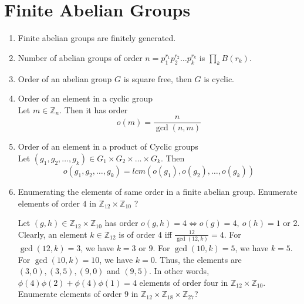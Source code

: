 \section{Finite Abelian Groups}
\begin{enumerate}
	\item Finite abelian groups are finitely generated.
	\item Number of abelian groups of order $n = p_1^{r_1}p_2^{r_2}\dots p_k^{r_k}$ is $\prod_k B(r_k)$.
	\item Order of an abelian group $G$ is square free, then $G$ is cyclic.
	\item Order of an element in a cyclic group\\
	Let $m \in \mathbb{Z}_n$.
	Then it has order $$o(m) = \frac{n}{\gcd(n,m)}$$
	\item Order of an element in a product of Cyclic groups\\
	Let $(g_1,g_2,\dots,g_k) \in G_1 \times G_2 \times \dots \times G_k$. Then 
	$$o(g_1,g_2,\dots,g_k) = lcm(o(g_1),o(g_2),\dots,o(g_k))$$
	\item Enumerating the elements of same order in a finite abelian group.
	\subitem Enumerate elements of order $4$ in $\mathbb{Z}_{12} \times \mathbb{Z}_{10}$ ? 

	Let $(g,h) \in \mathbb{Z}_{12} \times \mathbb{Z}_{10}$ has order $o(g,h)= 4 \iff o(g)=4,\ o(h) = 1 \text{ or } 2$. Clearly, an element $k \in \mathbb{Z}_{12}$ is of order $4$ iff $\frac{12}{\gcd(12,k)}=4$. For $\gcd(12,k)=3$, we have $k = 3$ or $9$. For $\gcd(10,k)=5$, we have $k=5$. For $\gcd(10,k)=10$, we have $k=0$. Thus, the elements are $(3,0),(3,5),(9,0)$ and $(9,5)$.  
	In other words, $\phi(4)\phi(2)+\phi(4)\phi(1)=4$ elements of order four in $\mathbb{Z}_{12} \times \mathbb{Z}_{10}$.
	\subitem Enumerate elements of order $9$ in $\mathbb{Z}_{12} \times \mathbb{Z}_{18} \times \mathbb{Z}_{27}$?


\end{enumerate}
